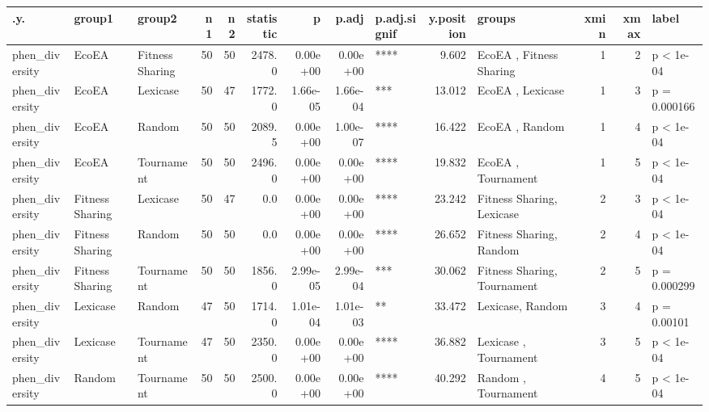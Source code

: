 \documentclass[]{book}
\begin{document}
\begin{table}
\centering
\begin{tabular}[t]{l|l|l|r|r|r|r|r|l|r|l|r|r|l}
\hline
.y. & group1 & group2 & n1 & n2 & statistic & p & p.adj & p.adj.signif & y.position & groups & xmin & xmax & label\\
\hline
phen\_diversity & EcoEA & Fitness Sharing & 50 & 50 & 2478.0 & 0.00e+00 & 0.00e+00 & **** & 9.602 & EcoEA          , Fitness Sharing & 1 & 2 & p < 1e-04\\
\hline
phen\_diversity & EcoEA & Lexicase & 50 & 47 & 1772.0 & 1.66e-05 & 1.66e-04 & *** & 13.012 & EcoEA   , Lexicase & 1 & 3 & p = 0.000166\\
\hline
phen\_diversity & EcoEA & Random & 50 & 50 & 2089.5 & 0.00e+00 & 1.00e-07 & **** & 16.422 & EcoEA , Random & 1 & 4 & p < 1e-04\\
\hline
phen\_diversity & EcoEA & Tournament & 50 & 50 & 2496.0 & 0.00e+00 & 0.00e+00 & **** & 19.832 & EcoEA     , Tournament & 1 & 5 & p < 1e-04\\
\hline
phen\_diversity & Fitness Sharing & Lexicase & 50 & 47 & 0.0 & 0.00e+00 & 0.00e+00 & **** & 23.242 & Fitness Sharing, Lexicase & 2 & 3 & p < 1e-04\\
\hline
phen\_diversity & Fitness Sharing & Random & 50 & 50 & 0.0 & 0.00e+00 & 0.00e+00 & **** & 26.652 & Fitness Sharing, Random & 2 & 4 & p < 1e-04\\
\hline
phen\_diversity & Fitness Sharing & Tournament & 50 & 50 & 1856.0 & 2.99e-05 & 2.99e-04 & *** & 30.062 & Fitness Sharing, Tournament & 2 & 5 & p = 0.000299\\
\hline
phen\_diversity & Lexicase & Random & 47 & 50 & 1714.0 & 1.01e-04 & 1.01e-03 & ** & 33.472 & Lexicase, Random & 3 & 4 & p = 0.00101\\
\hline
phen\_diversity & Lexicase & Tournament & 47 & 50 & 2350.0 & 0.00e+00 & 0.00e+00 & **** & 36.882 & Lexicase  , Tournament & 3 & 5 & p < 1e-04\\
\hline
phen\_diversity & Random & Tournament & 50 & 50 & 2500.0 & 0.00e+00 & 0.00e+00 & **** & 40.292 & Random    , Tournament & 4 & 5 & p < 1e-04\\
\hline
\end{tabular}
\end{table}
\end{document}
